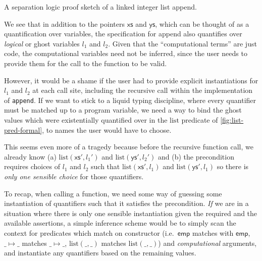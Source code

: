 \begin{marginfigure}
    \inputminted[breaklines,mathescape,fontsize=\small]{py}{code/append_annot.py}
    \caption{A separation logic proof sketch of a linked integer list
        append.}\label{fig:append-annot-formal}
\end{marginfigure}

We see that in addition to the pointers $\mathsf{xs}$ and $\mathsf{ys}$, which
can be thought of as a quantification over  variables, the
specification for append also quantifies over \emph{logical} or ghost variables
$l_1$ and $l_2$. Given that the ``computational terms'' are just code, the
computational variables need not be inferred, since the user needs to provide
them for the call to the function to be valid.

However, it would be a shame if the user had to provide explicit instantiations
for $l_1$ and $l_2$ at each call site, including the recursive call within the
implementation of \texttt{append}. If we want to stick to a liquid
typing discipline, where every quantifier must be matched up to a program
variable, we need a way to bind the ghost values which were existentially
quantified over in the $\mathrm{list}$ predicate of
\cref{fig:list-pred-formal}, to names the user would have to choose.

This seems even more of a tragedy because before the recursive function
call, we already know (a) $\mathrm{list}(\mathsf{xs}', l_1')$ and
$\mathrm{list}(\mathsf{ys}', l_2')$ and (b) the precondition requires choices
of $l_1$ and $l_2$ such that $\mathrm{list}(\mathsf{xs}', l_1)$ and
$\mathrm{list}(\mathsf{ys}', l_1)$ so there is \emph{only one sensible choice}
for those quantifiers.

To recap, when calling a function, we need some way of guessing some
instantiation of quantifiers such that it satisfies the precondition. \emph{If}
we are in a situation where there is only one sensible instantiation given the
required and the available assertions, a simple inference scheme would be to
simply scan the context for predicates which match on constructor (i.e.\
$\mathsf{emp}$ matches with $\mathsf{emp}$, $\_ \mapsto{} \_$ matches $\_
\mapsto{} \_$, $\mathrm{list(\_, \_)}$ matches $\mathrm{list}(\_, \_)$) and
\emph{computational} arguments, and instantiate any quantifiers based on the
remaining values.

